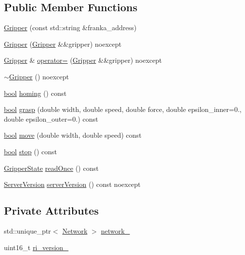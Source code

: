 \subsection*{Public Member Functions}
\begin{DoxyCompactItemize}
\item 
\hyperlink{classfranka_1_1Gripper_a02b30632b08001592c62d3563561afc5}{Gripper} (const std\+::string \&franka\+\_\+address)
\item 
\hyperlink{classfranka_1_1Gripper_aa045ea81b36f22420f9bc6f2a256a4f0}{Gripper} (\hyperlink{classfranka_1_1Gripper}{Gripper} \&\&gripper) noexcept
\item 
\hyperlink{classfranka_1_1Gripper}{Gripper} \& \hyperlink{classfranka_1_1Gripper_abb64ceecedcb3b2e2bebc262c1589be0}{operator=} (\hyperlink{classfranka_1_1Gripper}{Gripper} \&\&gripper) noexcept
\item 
\hyperlink{classfranka_1_1Gripper_ade253b8a35312d52c636c6aafb7b2e1d}{$\sim$\+Gripper} () noexcept
\item 
\hyperlink{classbool}{bool} \hyperlink{classfranka_1_1Gripper_aef356f93a4c3b9d6b2532c29126d478c}{homing} () const
\item 
\hyperlink{classbool}{bool} \hyperlink{classfranka_1_1Gripper_abff6a03a6c75b9079bd4b9b5ca380254}{grasp} (double width, double speed, double force, double epsilon\+\_\+inner=0., double epsilon\+\_\+outer=0.) const
\item 
\hyperlink{classbool}{bool} \hyperlink{classfranka_1_1Gripper_a047bc39267d66d6fb26c4c70669d68c2}{move} (double width, double speed) const
\item 
\hyperlink{classbool}{bool} \hyperlink{classfranka_1_1Gripper_add7397fb6c5631650c139d26a85c8e1d}{stop} () const
\item 
\hyperlink{structfranka_1_1GripperState}{Gripper\+State} \hyperlink{classfranka_1_1Gripper_ab0afc8a41c9c5fff808e76851dcf23ce}{read\+Once} () const
\item 
\hyperlink{classfranka_1_1Gripper_a613bf52d9433b733685d0fb9ea71602e}{Server\+Version} \hyperlink{classfranka_1_1Gripper_aa1b8386fd24408753362ee088d8f9a01}{server\+Version} () const noexcept
\end{DoxyCompactItemize}
\subsection*{Private Attributes}
\begin{DoxyCompactItemize}
\item 
std\+::unique\+\_\+ptr$<$ \hyperlink{classfranka_1_1Network}{Network} $>$ \hyperlink{classfranka_1_1Gripper_a0d6702c45e61147da44b08dd757890df}{network\+\_\+}
\item 
uint16\+\_\+t \hyperlink{classfranka_1_1Gripper_ae3698ae18399317ca4a7fc4154be602f}{ri\+\_\+version\+\_\+}
\end{DoxyCompactItemize}


